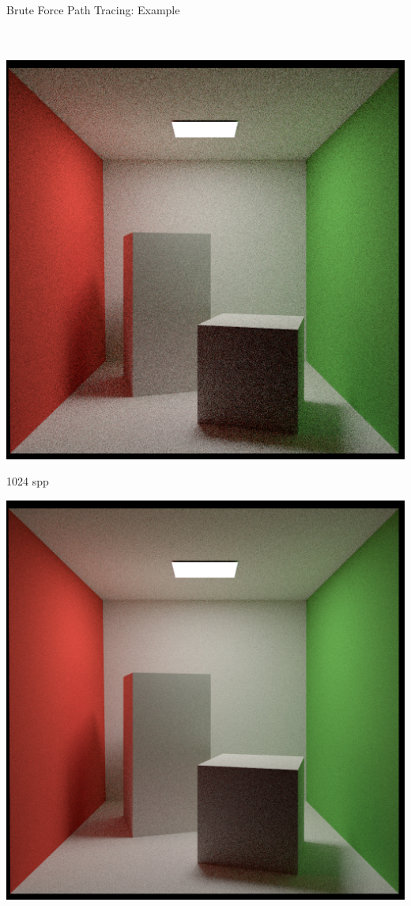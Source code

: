 \documentclass[utf8,stillsansserifmath,fleqn,t]{beamer}
\begin{document}
\begin{frame}[label=path-tracing-brute-force-example]
\frametitle{\insertsection}
Brute Force Path Tracing: Example\\
~\\
~\\
\begin{minipage}[t]{.33\textwidth}
\includegraphics[width=\textwidth]{./fig/cornellbox-bruteforce-1024spp.png}
\centerline{1024 spp\hphantom{Fp}}
\end{minipage}\hfill
\begin{minipage}[t]{.33\textwidth}
\includegraphics[width=\textwidth]{./fig/cornellbox-bruteforce-4096spp.png}

\end{minipage}
\end{frame}
\end{document}

